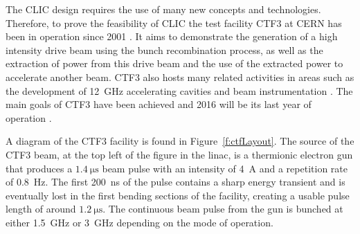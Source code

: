 
The CLIC design requires the use of many new concepts and technologies. Therefore, to prove the feasibility of CLIC the test facility CTF3 at CERN has been in operation since 2001 \cite{CTF3}. It aims to demonstrate the generation of a high intensity drive beam using the bunch recombination process, as well as the extraction of power from this drive beam and the use of the extracted power to accelerate another beam. CTF3 also hosts many related activities in areas such as the development of 12~GHz accelerating cavities and beam instrumentation \cite{ctf2015Status}. The main goals of CTF3 have been achieved and 2016 will be its last year of operation \cite{ctf2016Plan}.

A diagram of the CTF3 facility is found in Figure~\ref{f:ctfLayout}. The source of the CTF3 beam, at the top left of the figure in the linac, is a thermionic electron gun \cite{thermionic} that produces a \(1.4~\mathrm{\mu s}\) beam pulse with an intensity of 4~A and a repetition rate of 0.8~Hz. The first 200~ns of the pulse contains a sharp energy transient and is eventually lost in the first bending sections of the facility, creating a usable pulse length of around \(1.2~\mathrm{\mu s}\). The continuous beam pulse from the gun is bunched at either 1.5~GHz or 3~GHz depending on the mode of operation.


